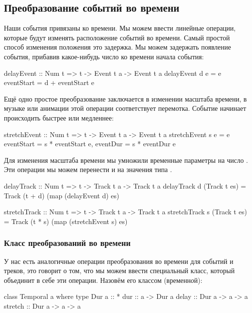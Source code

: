 \subsection{Преобразование событий во времени}

Наши события привязаны ко времени. Мы можем ввести линейные операции,
которые будут изменять расположение событий во времени. Самый простой
способ изменения положения это задержка. Мы можем задержать появление
события, прибавив какое-нибудь число ко времени начала события:


\begin{code}
delayEvent :: Num t => t -> Event t a -> Event t a
delayEvent d e = e{ eventStart = d + eventStart e }
\end{code}

Ещё одно простое преобразование заключается в изменении масштаба
времени, в музыке или анимации этой операции соответствует перемотка.
Событие начинает происходить быстрее или медленнее:


\begin{code}
stretchEvent :: Num t => t -> Event t a -> Event t a
stretchEvent s e = e{ 
    eventStart  = s * eventStart e, 
    eventDur    = s * eventDur   e }
\end{code}

Для изменения масштаба времени мы умножили временные параметры на число
. Эти операции мы можем перенести и на значения типа .


\begin{code}
delayTrack :: Num t => t -> Track t a -> Track t a
delayTrack d (Track t es) = Track (t + d) (map (delayEvent d) es) 

stretchTrack :: Num t => t -> Track t a -> Track t a
stretchTrack s (Track t es) = Track (t * s) (map (stretchEvent s) es) 
\end{code}

\subsubsection{Класс преобразований во времени}

У нас есть аналогичные операции преобразования во времени для событий и
треков, это говорит о том, что мы можем ввести специальный класс,
который объединит в себе эти операции. Назовём его классом 
(временн\emph{о}й):


\begin{code}
class Temporal a where
    type Dur a :: *
    dur     :: a -> Dur a
    delay   :: Dur a -> a -> a
    stretch :: Dur a -> a -> a
\end{code}

